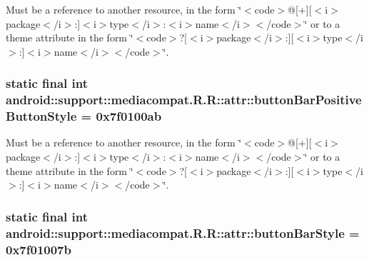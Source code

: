 Must be a reference to another resource, in the form \char`\"{}$<$code$>$@\mbox{[}+\mbox{]}\mbox{[}$<$i$>$package$<$/i$>$:\mbox{]}$<$i$>$type$<$/i$>$:$<$i$>$name$<$/i$>$$<$/code$>$\char`\"{} or to a theme attribute in the form \char`\"{}$<$code$>$?\mbox{[}$<$i$>$package$<$/i$>$:\mbox{]}\mbox{[}$<$i$>$type$<$/i$>$:\mbox{]}$<$i$>$name$<$/i$>$$<$/code$>$\char`\"{}. \hypertarget{classandroid_1_1support_1_1mediacompat_1_1_r_1_1attr_395c1c3478d4febccfd9be03e443b597}{
\subsubsection[{buttonBarPositiveButtonStyle}]{\setlength{\rightskip}{0pt plus 5cm}static final int android::support::mediacompat.R.R::attr::buttonBarPositiveButtonStyle = 0x7f0100ab}}
\label{classandroid_1_1support_1_1mediacompat_1_1_r_1_1attr_395c1c3478d4febccfd9be03e443b597}


Must be a reference to another resource, in the form \char`\"{}$<$code$>$@\mbox{[}+\mbox{]}\mbox{[}$<$i$>$package$<$/i$>$:\mbox{]}$<$i$>$type$<$/i$>$:$<$i$>$name$<$/i$>$$<$/code$>$\char`\"{} or to a theme attribute in the form \char`\"{}$<$code$>$?\mbox{[}$<$i$>$package$<$/i$>$:\mbox{]}\mbox{[}$<$i$>$type$<$/i$>$:\mbox{]}$<$i$>$name$<$/i$>$$<$/code$>$\char`\"{}. \hypertarget{classandroid_1_1support_1_1mediacompat_1_1_r_1_1attr_e6a2a5d9953a8e89b081f08ac9b2f961}{
\subsubsection[{buttonBarStyle}]{\setlength{\rightskip}{0pt plus 5cm}static final int android::support::mediacompat.R.R::attr::buttonBarStyle = 0x7f01007b}}
\label{classandroid_1_1support_1_1mediacompat_1_1_r_1_1attr_e6a2a5d9953a8e89b081f08ac9b2f961}



